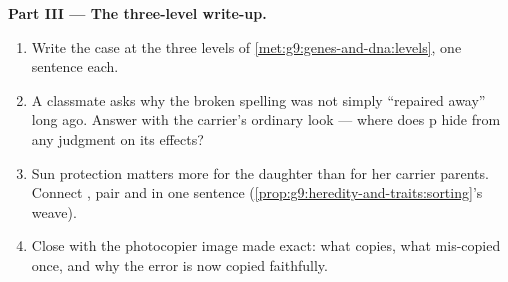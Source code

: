 \begin{problem}
\medskip\noindent\textbf{Part III --- The three-level
write-up.}
\begin{enumerate}[resume]
  \item Write the case at the three levels of
        \cref{met:g9:genes-and-dna:levels}, one sentence
        each.
  \item A classmate asks why the broken spelling was not
        simply ``repaired away'' long ago. Answer with
        the carrier's ordinary look --- where does p
        hide from any judgment on its effects?
  \item Sun protection matters more for the daughter
        than for her carrier parents. Connect ,
         pair and  in one sentence
        (\cref{prop:g9:heredity-and-traits:sorting}'s
        weave).
  \item Close with the photocopier image made exact:
        what copies, what mis-copied once, and why the
        error is now copied faithfully.
\end{enumerate}
\end{problem}
